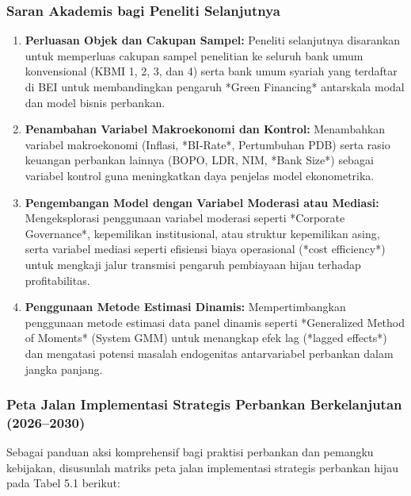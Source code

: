 \documentclass[12pt,a4paper]{article}
\numberwithin{equation}{section}
\begin{document}
\subsubsection{Saran Akademis bagi Peneliti Selanjutnya}
\begin{enumerate}[label=\alph*.]
  \item \textbf{Perluasan Objek dan Cakupan Sampel:} Peneliti selanjutnya disarankan untuk memperluas cakupan sampel penelitian ke seluruh bank umum konvensional (KBMI 1, 2, 3, dan 4) serta bank umum syariah yang terdaftar di BEI untuk membandingkan pengaruh *Green Financing* antarskala modal dan model bisnis perbankan.
  \item \textbf{Penambahan Variabel Makroekonomi dan Kontrol:} Menambahkan variabel makroekonomi (Inflasi, *BI-Rate*, Pertumbuhan PDB) serta rasio keuangan perbankan lainnya (BOPO, LDR, NIM, *Bank Size*) sebagai variabel kontrol guna meningkatkan daya penjelas model ekonometrika.
  \item \textbf{Pengembangan Model dengan Variabel Moderasi atau Mediasi:} Mengeksplorasi penggunaan variabel moderasi seperti *Corporate Governance*, kepemilikan institusional, atau struktur kepemilikan asing, serta variabel mediasi seperti efisiensi biaya operasional (*cost efficiency*) untuk mengkaji jalur transmisi pengaruh pembiayaan hijau terhadap profitabilitas.
  \item \textbf{Penggunaan Metode Estimasi Dinamis:} Mempertimbangkan penggunaan metode estimasi data panel dinamis seperti *Generalized Method of Moments* (System GMM) untuk menangkap efek lag (*lagged effects*) dan mengatasi potensi masalah endogenitas antarvariabel perbankan dalam jangka panjang.
\end{enumerate}

\subsubsection{Peta Jalan Implementasi Strategis Perbankan Berkelanjutan (2026--2030)}
\noindent
Sebagai panduan aksi komprehensif bagi praktisi perbankan dan pemangku kebijakan, disusunlah matriks peta jalan implementasi strategis perbankan hijau pada Tabel 5.1 berikut:
\end{document}
